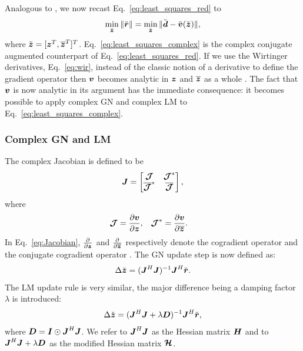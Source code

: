 \documentclass[useAMS,usenatbib]{mn2e}
\newcommand{\bz}{\bmath{z}}
\newcommand{\br}{\bmath{r}}
\newcommand{\bd}{\bmath{d}}
\newcommand{\bv}{\bmath{v}}
\newcommand{\bJ}{\bmath{J}}
\newcommand{\bD}{\bmath{D}}
\newcommand{\bH}{\bmath{H}}
\newcommand{\bI}{\bmath{I}}
\newcommand{\bmJ}{\bmath{\mathcal{J}}}
\newcommand{\bmH}{\bmath{\mathcal{H}}}
\newcommand{\conj}[1]{\overline{#1}}
\begin{document}
Analogous to \cite{Smirnov2015}, we now recast Eq.~\eqref{eq:least_squares_red} to 
\begin{equation}
\label{eq:least_squares_complex}
\min_{\breve{\bz}} \|\breve{\br}\| = \min_{\breve{\bz}} \|\breve{\bd} - \breve{\bv}(\breve{\bz})\|, 
\end{equation}
where $\breve{\bz} = [\bz^T,\conj{\bz}^T]^T$. Eq.~\eqref{eq:least_squares_complex} is the complex conjugate augmented counterpart of Eq.~\eqref{eq:least_squares_red}.
If we use the Wirtinger derivatives, Eq.~\eqref{eq:wir}, instead of the classic notion of a derivative to define the gradient operator then 
$\bv$ becomes analytic in $\bz$ and $\conj{\bz}$ as a whole \citep{Smirnov2015}. The fact that $\bv$ is now analytic in its argument has the immediate consequence: it becomes possible to apply complex GN
and complex LM to Eq.~\eqref{eq:least_squares_complex}. 

\subsubsection{Complex GN and LM}
\label{sec:complex_GN_LM}
The complex Jacobian is defined to be
\begin{equation}
\label{eq:Jacobian}
\bJ = \begin{bmatrix}
       \bmJ & \bmJ^*\\
       \conj{\bmJ}^* & \conj{\bmJ} 
      \end{bmatrix},
\end{equation}
where 
\begin{align}
\bmJ &= \frac{\partial \bv}{\partial \bz}, & \bmJ^* &= \frac{\partial \bv}{\partial \conj{\bz}}. 
\end{align}
In Eq.~\eqref{eq:Jacobian}, $\frac{\partial}{\partial \bz}$ and $\frac{\partial}{\partial \conj{\bz}}$ respectively denote the cogradient operator and the conjugate cogradient operator \citep{Sorber2012}.
The GN update step is now defined as:
\begin{equation}
\label{eq:GN_update}
 \Delta \breve{\bz} = (\bJ^H\bJ)^{-1}\bJ^H\breve{\br}.
\end{equation}
The LM update rule is very similar, the major difference being a damping factor $\lambda$ is introduced:
\begin{equation}
\label{eq:LM_update}
\Delta \breve{\bz} = (\bJ^H\bJ + \lambda\bD)^{-1}\bJ^H\breve{\br},
\end{equation}
where $\bD=\bI\odot\bJ^H\bJ$. We refer to $\bJ^H\bJ$ as the Hessian matrix $\bH$ and to $\bJ^H\bJ + \lambda\bD$ as the modified Hessian matrix $\bmH$. 
\end{document}
